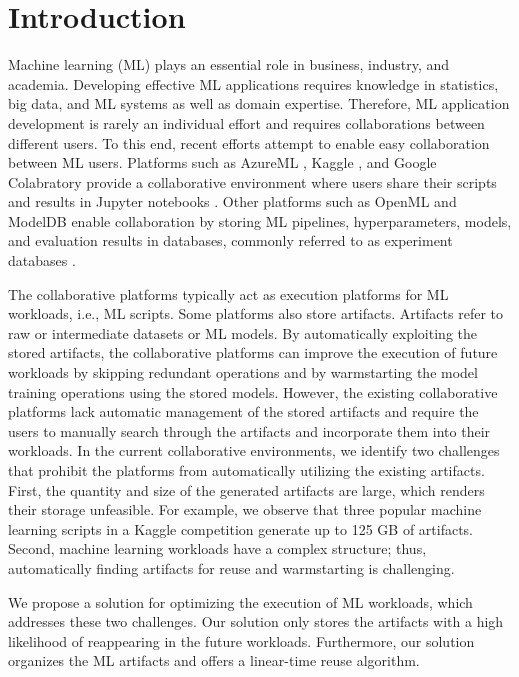 \section{Introduction} \label{sec-introduction}
Machine learning (ML) plays an essential role in business, industry, and academia. 
Developing effective ML applications requires knowledge in statistics, big data, and ML systems as well as domain expertise.
Therefore, ML application development is rarely an individual effort and requires collaborations between different users.
To this end, recent efforts attempt to enable easy collaboration between ML users.
Platforms such as AzureML \cite{team2016azureml}, Kaggle \cite{kagglewebsite}, and Google Colabratory \cite{googlecolab} provide a collaborative environment where users share their scripts and results in Jupyter notebooks \cite{Kluyver:2016aa}.
Other platforms such as OpenML \cite{vanschoren2014openml} and ModelDB \cite{vartak2016m} enable collaboration by storing ML pipelines, hyperparameters, models, and evaluation results in databases, commonly referred to as experiment databases \cite{Vanschoren2012}.

The collaborative platforms typically act as execution platforms for ML workloads, i.e., ML scripts.
Some platforms also store artifacts.
Artifacts refer to raw or intermediate datasets or ML models.
By automatically exploiting the stored artifacts, the collaborative platforms can improve the execution of future workloads by skipping redundant operations and by warmstarting the model training operations using the stored models.
However, the existing collaborative platforms lack automatic management of the stored artifacts and require the users to manually search through the artifacts and incorporate them into their workloads.
In the current collaborative environments, we identify two challenges that prohibit the platforms from automatically utilizing the existing artifacts.
First, the quantity and size of the generated artifacts are large, which renders their storage unfeasible.
For example, we observe that three popular machine learning scripts in a Kaggle competition generate up to 125 GB of artifacts.
Second, machine learning workloads have a complex structure; thus, automatically finding artifacts for reuse and warmstarting is challenging.

We propose a solution for optimizing the execution of ML workloads, which addresses these two challenges.
Our solution only stores the artifacts with a high likelihood of reappearing in the future workloads.
Furthermore, our solution organizes the ML artifacts and offers a linear-time reuse algorithm.


